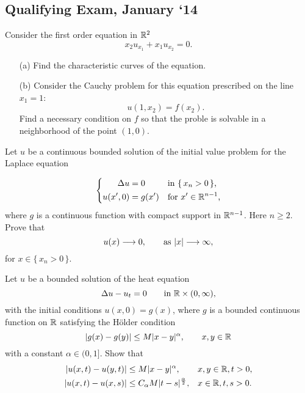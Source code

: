 \subsection{Qualifying Exam, January `14}
\begin{problem}
  Consider the first order equation in \(\mathbb{R}^2\)
  \[
    x_2u_{x_1}+x_1u_{x_2}=0.
  \]
  \begin{itemize}[noitemsep]
  \item[(a)] Find the characteristic curves of the equation.
  \item[(b)] Consider the Cauchy problem for this equation prescribed on
    the line \(x_1=1\):
    \[
      u(1,x_2)=f(x_2).
    \]
    Find a necessary condition on \(f\) so that the proble is solvable in a
    neighborhood of the point \((1,0)\).
  \end{itemize}
\end{problem}
\begin{solution*}
\end{solution*}

\begin{problem}
  Let \(u\) be a continuous bounded solution of the initial value problem
  for the Laplace equation

  \[
    \left\{
      \begin{aligned}
        \Delta u&=0&&\text{in \(\{\,x_n>0\,\}\),}\\
        u(x',0)&=g(x')&&\text{for \(x'\in\mathbb{R}^{n-1}\),}
      \end{aligned}
    \right.
  \]
  where \(g\) is a continuous function with compact support in
  \(\mathbb{R}^{n-1}\). Here \(n\geq 2\). Prove that
  \[
    u(x)\To 0,\qquad%
    \text{as } |x|\To \infty,
  \]
  for \(x\in\{\,x_n>0\,\}\).
\end{problem}
\begin{solution*}
\end{solution*}

\begin{problem}
  Let \(u\) be a bounded solution of the heat equation
  \[
    \Delta u-u_t=0\qquad\text{in \(\mathbb{R}\times(0,\infty)\),}
  \]
  with the initial conditions \(u(x,0)=g(x)\), where \(g\) is a bounded
  continuous function on \(\mathbb{R}\) satisfying the Hölder condition
  \[
    |g(x)-g(y)|\leq M|x-y|^\alpha,\qquad x,y\in\mathbb{R}
  \]
  with a constant \(\alpha\in (0, 1]\). Show that
  \[
    \begin{aligned}
      |u(x,t)-u(y,t)|&\leq M|x-y|^\alpha,&&x,y\in\mathbb{R},t>0,\\
      |u(x,t)-u(x,s)|&\leq C_\alpha M|t-s|^{\frac{\alpha}{2}},&&x\in\mathbb{R},t,s>0.
    \end{aligned}
  \]

  \noindent [\emph{Hint:} For the last inequality, in the representation
  formula of \(u(x,t)\) as a convolution with the heat kernel
  \(\Phi(y,t)\), make a change of variables \(z=\frac{y}{\sqrt{t}}\) and use that
  $\left|\sqrt{t}-\sqrt{s}\right|\leq\sqrt{|t-s|}$.]
\end{problem}
\begin{solution*}
\end{solution*}

